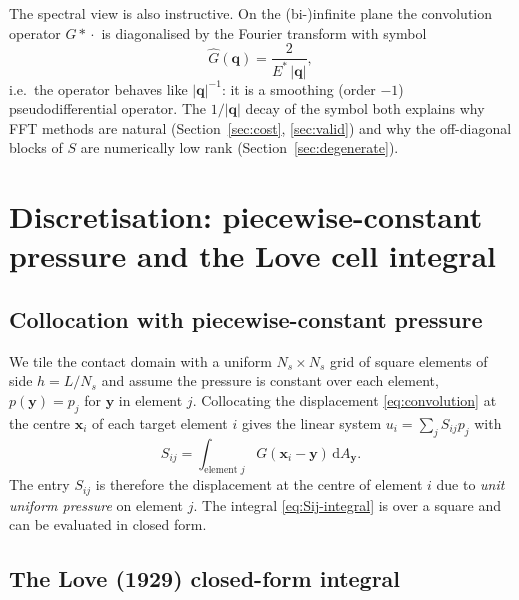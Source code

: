 \documentclass[11pt,a4paper]{article}
\newcommand{\Es}{E^{*}}
\newcommand{\abs}[1]{\left\lvert #1 \right\rvert}
\newcommand{\xx}{\mathbf{x}}
\newcommand{\yy}{\mathbf{y}}
\theoremstyle{definition}
\theoremstyle{remark}
\begin{document}
The spectral view is also instructive. On the (bi-)infinite plane the convolution
operator $G\!*\!\cdot$ is diagonalised by the Fourier transform with symbol
\begin{equation}
  \widehat{G}(\mathbf q) = \frac{2}{\Es\,\abs{\mathbf q}},
  \label{eq:symbol}
\end{equation}
i.e.\ the operator behaves like $\abs{\mathbf q}^{-1}$: it is a smoothing
(order $-1$) pseudodifferential operator. The $1/\abs{\mathbf q}$ decay of the
symbol both explains why FFT methods are natural (Section~\ref{sec:cost},
\ref{sec:valid}) and why the off-diagonal blocks of $S$ are numerically low
rank (Section~\ref{sec:degenerate}).

\section{Discretisation: piecewise-constant pressure and the Love cell integral}
\label{sec:discretisation}

\subsection{Collocation with piecewise-constant pressure}

We tile the contact domain with a uniform $N_s\times N_s$ grid of square
elements of side $h=L/N_s$ and assume the pressure is constant over each element,
$p(\yy)=p_j$ for $\yy$ in element $j$. Collocating the displacement
\eqref{eq:convolution} at the centre $\xx_i$ of each target element $i$ gives the
linear system $u_i=\sum_j S_{ij} p_j$ with
\begin{equation}
  S_{ij} = \int_{\text{element }j} G(\xx_i-\yy)\,\mathrm{d}A_{\yy}.
  \label{eq:Sij-integral}
\end{equation}
The entry $S_{ij}$ is therefore the displacement at the centre of element $i$ due
to \emph{unit uniform pressure} on element $j$. The integral
\eqref{eq:Sij-integral} is over a square and can be evaluated in closed form.

\subsection{The Love (1929) closed-form integral}
\end{document}
